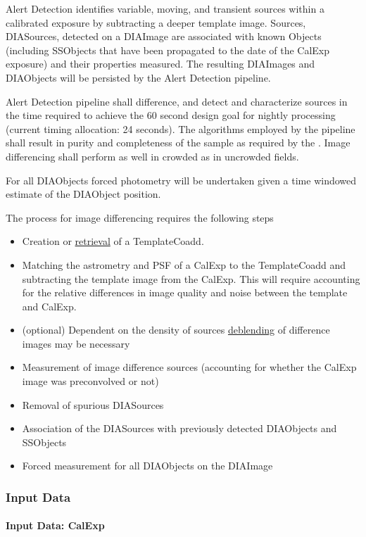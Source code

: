 Alert Detection identifies variable, moving, and transient sources within a calibrated exposure by subtracting a deeper template image. Sources, DIASources, detected on a DIAImage are associated with known Objects (including SSObjects that have been propagated to the date of the CalExp exposure) and their properties measured. The resulting DIAImages and DIAObjects will be persisted by the Alert Detection pipeline.

Alert Detection pipeline shall difference, and detect and characterize sources in the time required to achieve the 60 second design goal for nightly processing (current timing allocation: 24 seconds). The algorithms employed by the pipeline shall result in purity and completeness of the sample as required by the \DMSR\@. Image differencing shall perform as well in crowded as in uncrowded fields. 

For all DIAObjects forced photometry will be undertaken given a time windowed estimate of the DIAObject position.


The process for image differencing requires the following steps
\begin{itemize}
\item Creation or \hyperref[sec:acRetrieveTemplate]{retrieval} of a TemplateCoadd.
\item Matching the astrometry and PSF of a CalExp to the TemplateCoadd and subtracting the template image from the CalExp. This will require accounting for the relative differences in image quality and noise between the template and CalExp.
\item (optional) Dependent on the density of sources \hyperref[sec:acSingleFrameDeblending]{deblending} of difference images may be necessary
\item Measurement of image difference sources (accounting for whether the CalExp image was preconvolved or not)
\item Removal of spurious DIASources 
\item Association of the DIASources with previously detected DIAObjects and SSObjects
\item Forced measurement for all DIAObjects on the DIAImage
\end{itemize}



\subsubsection{Input Data}

\paragraph{Input Data: CalExp}

